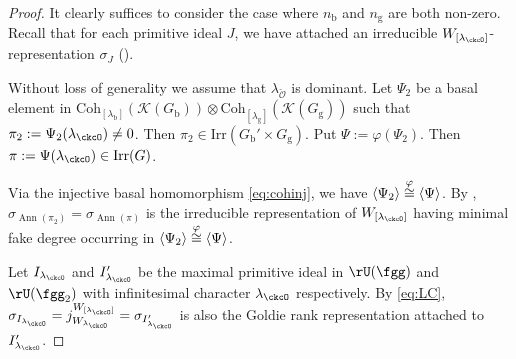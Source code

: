 \documentclass[12pt,a4paper]{amsart}
\newcommand{\CK}{{\mathcal {K}}}
\newcommand{\CO}{{\mathcal {O}}}
\DeclareMathOperator{\Ann}{Ann}
\numberwithin{equation}{section}
\theoremstyle{remark}
\def\Irr{\mathrm{Irr}}
\def\lamck{\lambda_\ckcO}
\def\WLamck{W_{[\lambda_{\ckcO}]}}
\def\nbb{n_{\mathrm b}}
\def\ngg{n_{\mathrm g}}
\def\Coh{\mathrm{Coh}}
\def\Gb{G_{\mathrm b}}
\def\Gg{G_{\mathrm g}}
\def\lamb{\lambda_{\mathrm b}}
\def\lamg{\lambda_{\mathrm g}}
\begin{document}
\def\IFF{\text{ if and only if }}
\def\IFF{\Longleftrightarrow\ \  }
\begin{proof}
  It clearly suffices to consider the case where $\nbb$ and $\ngg$ are both non-zero.
  Recall that for each
  primitive ideal $J$, we have attached an irreducible $\WLamck$-representation
  $\sigma_{J}$ ().

 Without loss of generality we assume that $\lambda_{\check \CO}$ is dominant.  Let $\Psi_{2}$ be a basal element in
  $\Coh_{[\lamb]}(\CK(\Gb))\otimes \Coh_{[\lamg]}(\CK(\Gg))$ such that $\pi_2:=\Psi_2(\lamck) \neq 0$. Then $\pi_2\in \Irr(\Gb'\times \Gg)$.
  Put $\Psi:=\varphi(\Psi_{2})$. Then
  $\pi:=\Psi(\lamck) \in \Irr(G)$.

  Via the injective basal homomorphism \eqref{eq:cohinj}, we have $\braket{\Psi_{2}}\stackrel{\varphi}{\cong} \braket{\Psi}$.
  By , $\sigma_{\Ann(\pi_{2})} = \sigma_{\Ann(\pi)}$ is the irreducible representation of $\WLamck$ having minimal fake degree
  occurring in $\braket{\Psi_{2}}\stackrel{\varphi}{\cong} \braket{\Psi}$.

  Let $I_{\lamck}$ and $I'_{\lamck}$ be the maximal primitive ideal in $\rU(\fgg)$
  and $\rU(\fgg_{2})$
  with infinitesimal
  character $\lamck$ respectively.
  By \eqref{eq:LC}, $\sigma_{I_{\lamck}} = j_{W_{\lamck}}^{\WLamck} = \sigma_{I'_{\lamck}}$ is also the Goldie rank representation attached to $I'_{\lamck}$.


\end{proof}
\end{document}
